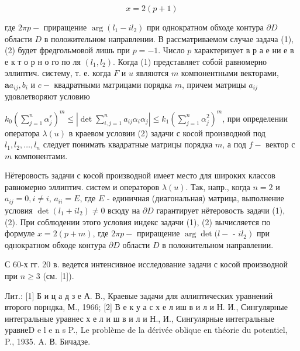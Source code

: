 \documentclass[10pt]{article}
\begin{document}
\[

x=2(p+1)

\]



где $2 \pi p-$ приращение $\arg \left(l_{1}-i l_{2}\right)$ при однократном обходе контура $\partial D$ области $D$ в положительном направлении. В рассматриваемом случае задача (1), (2) будет фредгольмовой лишь при $p=-1$. Число $p$ характеризует в р а е ни е в е к т о р н о го по ля $\left(l_{1}, l_{2}\right)$. Когда (1) представляет собой равномерно эллиптич. систему, т. е. когда $F$ и $u$ являются $m$ компонентными векторами, $\mathbf{a} a_{i j}, b_{i}$ и $c-$ квадратными матрицами порядка $m$, причем матрицы $a_{i j}$ удовлетворяют условию



$k_{0}\left(\sum_{j=1}^{n} \alpha_{j}^{r}\right)^{m} \leqslant\left|\operatorname{det} \sum_{i, j=1}^{n} a_{i j} \alpha_{i} \alpha_{j}\right| \leqslant k_{1}\left(\sum_{j=1}^{n} \alpha_{j}^{2}\right)^{m}$, при определении оператора $\lambda(u)$ в краевом условии (2) задачи с косой производной под $l_{1}, l_{2}, \ldots, l_{n}$ следует понимать квадратные матрицы порядка $m$, а под $f-$ вектор с $m$ компонентами.



Нётеровость задачи с косой производной имеет место для широких классов равномерно эллиптич. систем и операторов $\lambda(u)$. Так, напр., когда $n=2$ и $a_{i j}=0, i \neq i$, $a_{i i}=E$, где $E$ - единичная (диагональная) матрица, выполнение условия $\operatorname{det}\left(l_{1}+i l_{2}\right) \neq 0$ всюду на $\partial D$ гарантирует нётеровость задачи (1), (2). При соблюдении этого условия индекс задачи (1), (2) вычисляется по формуле $x=2(p+m)$, где $2 \pi p-$ приращение $\arg \operatorname{det}(l-$ - $\left.i l_{2}\right)$ при однократном обходе контура $\partial D$ области $D$ в положительном направлении.



С 60-х гг. 20 в. ведется интенсивное исследование задачи с косой производной при $n \geqslant 3$ (см. [1]).



Лит.: [1] Б и ц а д з е А. В., Краевые задачи для әллиптических уравнений второго порндка, М., 1966; [2] В е к у а с х е л иш в и л и Н. И., Сингулярные интегральные уравнес х е л и ш в и л и Н., И., Сингулярные интегральные уравнеD e l e n s P., Le problème de la dérivée oblique en théorie du potentiel, P., 1935. A. В. Бичадзе.
\end{document}
